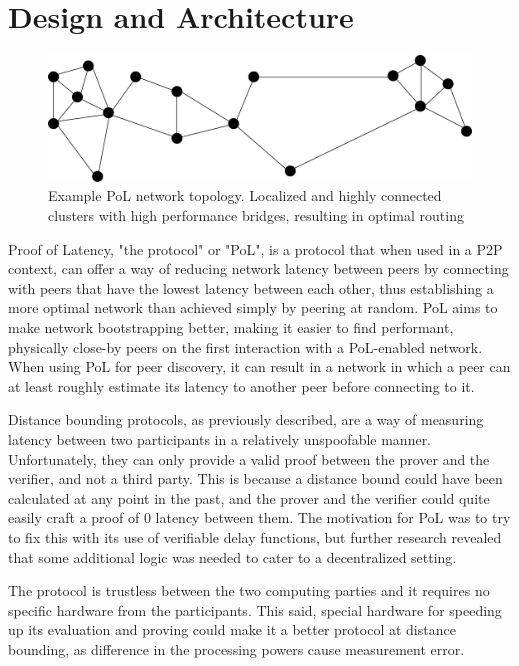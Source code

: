 \chapter{Design and Architecture}
\label{Proof of Latency}
\begin{figure}
	\includegraphics[width=\textwidth]{pictures/pol_topology.pdf}
	\caption{Example PoL network topology. Localized and highly connected clusters with high performance bridges, resulting in optimal routing}
	\label{PoL Example Topology}
\end{figure}
Proof of Latency, "the protocol" or "PoL", is a protocol that when used in a P2P context, can offer a way of reducing network latency between peers by connecting with peers that have the lowest latency between each other, thus establishing a more optimal network than achieved simply by peering at random. PoL aims to make network bootstrapping better, making it easier to find performant, physically close-by peers on the first interaction with a PoL-enabled network. When using PoL for peer discovery, it can result in a network in which a peer can at least roughly estimate its latency to another peer before connecting to it.

Distance bounding protocols, as previously described, are a way of measuring latency between two participants in a relatively unspoofable manner. Unfortunately, they can only provide a valid proof between the prover and the verifier, and not a third party. This is because a distance bound could have been calculated at any point in the past, and the prover and the verifier could quite easily craft a proof of 0 latency between them. The motivation for PoL was to try to fix this with its use of verifiable delay functions, but further research revealed that some additional logic was needed to cater to a decentralized setting.

The protocol is trustless between the two computing parties and it requires no specific hardware from the participants. This said, special hardware for speeding up its evaluation and proving could make it a better protocol at distance bounding, as difference in the processing powers cause measurement error.

